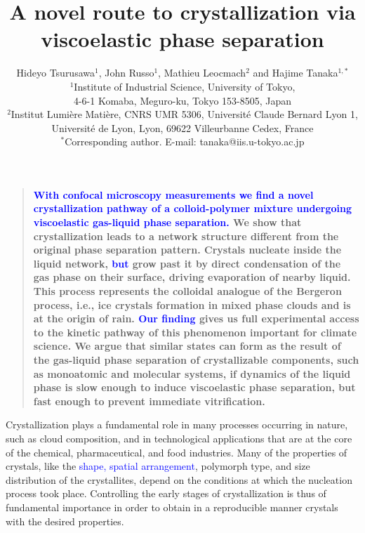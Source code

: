 \documentclass[12pt]{article}
\title{A novel route to crystallization via viscoelastic phase separation}
\author{Hideyo Tsurusawa$^1$, John Russo$^1$, Mathieu Leocmach$^{2}$ and Hajime Tanaka$^{1,\ast}$ 
\\
\normalsize{$^1$Institute of Industrial Science, University of Tokyo,}\\
\normalsize{4-6-1 Komaba, Meguro-ku, Tokyo 153-8505, Japan}\\
\normalsize{$^2$Institut Lumière Matière, CNRS UMR 5306, Université Claude Bernard Lyon 1, }\\
\normalsize{Université de Lyon, Lyon, 69622 Villeurbanne Cedex, France}\\
\normalsize{$^\ast$Corresponding author. E-mail: tanaka@iis.u-tokyo.ac.jp}}
\newenvironment{sciabstract}{%
\begin{quote} \bf}
{\end{quote}}
\begin{document}
\baselineskip24pt


\maketitle
\vspace{-1.5cm}
\begin{sciabstract}
\textcolor{blue}{
With confocal microscopy measurements we find a novel crystallization pathway of a colloid-polymer mixture undergoing viscoelastic gas-liquid phase separation.} We show that crystallization leads to a network structure different from the original phase separation pattern. Crystals nucleate inside the liquid network, \textcolor{blue}{but} grow past it by direct condensation of the gas phase on their surface, driving evaporation of nearby liquid. This process represents the colloidal analogue of the Bergeron process, i.e., ice crystals formation in mixed phase clouds and is at the origin of rain. \textcolor{blue}{Our finding} gives us full experimental access to the kinetic pathway of this phenomenon important for climate science. We argue that similar states can form as the result of the gas-liquid phase separation of crystallizable components, such as monoatomic and molecular systems, if dynamics of the liquid phase is slow enough to induce viscoelastic phase separation, but fast enough to prevent immediate vitrification.
\end{sciabstract}


\maketitle

\clearpage

Crystallization plays a fundamental role in many processes occurring in nature, such as cloud composition, and in technological applications
that are at the core of the chemical, pharmaceutical, and food industries.
Many of the properties of crystals, like the \textcolor{blue}{shape, spatial arrangement}, polymorph type, and size distribution of the crystallites, depend on the conditions at which
the nucleation process took place. Controlling the early stages of crystallization is thus of fundamental importance in order to
obtain in a reproducible manner crystals with the desired properties. 
\end{document}
